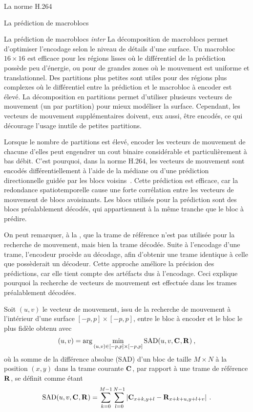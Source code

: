 \begin{chapter}{La norme H.264}
\begin{section}{La prédiction de macroblocs}
\begin{subsection}{La prédiction de macroblocs \textit{inter}}
La décomposition de macroblocs permet d'optimiser l'encodage selon le niveau de
détails d'une surface. Un macrobloc $16 \times 16$ est efficace pour les régions
lisses où le différentiel de la prédiction possède peu d'énergie, ou pour de
grandes zones où le mouvement est uniforme et translationnel. Des partitions
plus petites sont utiles pour des régions plus complexes où le différentiel
entre la prédiction et le macrobloc à encoder est élevé. La décomposition en
partitions permet d'utiliser plusieurs vecteurs de mouvement (un par partition)
pour mieux modéliser la surface. Cependant, les vecteurs de mouvement
supplémentaires doivent, eux aussi, être encodés, ce qui décourage l'usage
inutile de petites partitions.

Lorsque le nombre de partitions est élevé, encoder les vecteurs de mouvement de
chacune d'elles peut engendrer un cout binaire considérable et particulièrement
à bas débit. C'est pourquoi, dans la norme H.264, les vecteurs de mouvement
sont encodés différentiellement à l'aide de la médiane ou d'une prédiction
directionnelle guidée par les blocs voisins~\citep{Wiegand2003}. Cette
prédiction est efficace, car la redondance spatiotemporelle cause une forte
corrélation entre les vecteurs de mouvement de blocs avoisinants. Les blocs
utilisés pour la prédiction sont des blocs préalablement décodés, qui
appartiennent à la même tranche que le bloc à prédire.

On peut remarquer, à la  ,
que la trame de référence n'est pas utilisée pour la recherche de mouvement,
mais bien la trame décodée. Suite à l'encodage d'une trame, l'encodeur procède
au décodage, afin d'obtenir une trame identique à celle que possèderait un
décodeur. Cette approche améliore la précision des prédictions, car elle tient
compte des artéfacts dus à l'encodage. Ceci explique pourquoi la recherche de
vecteurs de mouvement est effectuée dans les trames préalablement décodées.

Soit $(u,v)$ le vecteur de mouvement, issu de la recherche de mouvement à
l'intérieur d'une surface $[-p, p] \times [-p, p]$, entre le bloc à encoder et
le bloc le plus fidèle obtenu avec
\begin{equation}
\label{eq-MotionVectors}
(u, v) = \arg \min_{(u,v) \in [-p, p] \times [-p, p]} \textrm{SAD}(u, v, \mathbf{C}_{}, \mathbf{R}_{})
\:,
\end{equation}
où la somme de la différence absolue (SAD) d'un bloc de taille $M\times N$ à la
position $(x,y)$ dans la trame courante $\mathbf{C}_{}$, par rapport à une trame de
référence $\mathbf{R}_{}$, se définit comme étant
\begin{equation}
\textrm{SAD}(u,v, \mathbf{C}_{}, \mathbf{R}_{}) = \sum_{k=0}^{M-1}\sum_{l=0}^{N-1} \left|
\mathbf{C}_{x+k,y+l} - \mathbf{R}_{x+k+u,y+l+v} \right|\:.
\end{equation}


\end{subsection}
\end{section}
\end{chapter}
